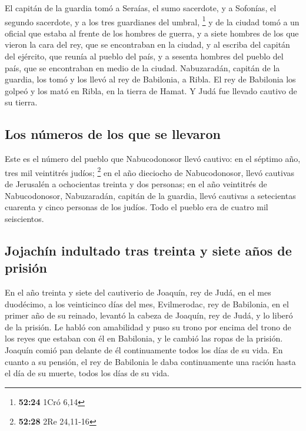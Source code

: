  El capitán de la guardia tomó a Seraías, el sumo
sacerdote, y a Sofonías, el segundo sacerdote, y a los tres guardianes
del umbral, \footnote{\textbf{52:24} 1Cró 6,14}  y de la
ciudad tomó a un oficial que estaba al frente de los hombres de guerra,
y a siete hombres de los que vieron la cara del rey, que se encontraban
en la ciudad, y al escriba del capitán del ejército, que reunía al
pueblo del país, y a sesenta hombres del pueblo del país, que se
encontraban en medio de la ciudad.  Nabuzaradán, capitán
de la guardia, los tomó y los llevó al rey de Babilonia, a Ribla.
 El rey de Babilonia los golpeó y los mató en Ribla, en
la tierra de Hamat. Y Judá fue llevado cautivo de su tierra.

\hypertarget{los-nuxfameros-de-los-que-se-llevaron}{%
\subsection{Los números de los que se
llevaron}\label{los-nuxfameros-de-los-que-se-llevaron}}

 Este es el número del pueblo que Nabucodonosor llevó
cautivo: en el séptimo año, tres mil veintitrés judíos; \footnote{\textbf{52:28}
  2Re 24,11-16}  en el año dieciocho de Nabucodonosor,
llevó cautivas de Jerusalén a ochocientas treinta y dos personas;
 en el año veintitrés de Nabucodonosor, Nabuzaradán,
capitán de la guardia, llevó cautivas a setecientas cuarenta y cinco
personas de los judíos. Todo el pueblo era de cuatro mil seiscientos.

\hypertarget{jojachuxedn-indultado-tras-treinta-y-siete-auxf1os-de-prisiuxf3n}{%
\subsection{Jojachín indultado tras treinta y siete años de
prisión}\label{jojachuxedn-indultado-tras-treinta-y-siete-auxf1os-de-prisiuxf3n}}

 En el año treinta y siete del cautiverio de Joaquín, rey
de Judá, en el mes duodécimo, a los veinticinco días del mes,
Evilmerodac, rey de Babilonia, en el primer año de su reinado, levantó
la cabeza de Joaquín, rey de Judá, y lo liberó de la prisión.
 Le habló con amabilidad y puso su trono por encima del
trono de los reyes que estaban con él en Babilonia,  y le
cambió las ropas de la prisión. Joaquín comió pan delante de él
continuamente todos los días de su vida.  En cuanto a su
pensión, el rey de Babilonia le daba continuamente una ración hasta el
día de su muerte, todos los días de su vida.
